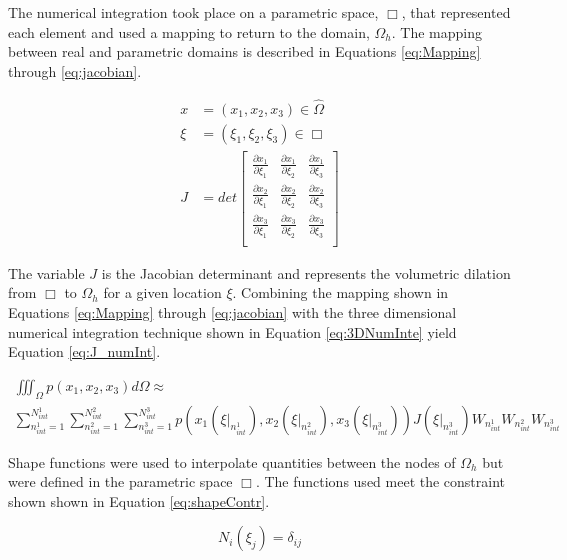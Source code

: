 \documentclass[a4paper, 12pt]{article}
\begin{document}
The numerical integration took place on a parametric space, $\Box$, that represented each
element and used a mapping to return to the domain, $\Omega_h$.
The mapping between real and parametric domains is described in
Equations \ref{eq:Mapping} through \ref{eq:jacobian}.

\begin{align}
x   &= (x_1, x_2, x_3) \in \hat{\Omega}
  \label{eq:Mapping} \\
\xi &= (\xi_1, \xi_2, \xi_3) \in \Box \\
J &= det
  \begin{bmatrix}
    \frac{\partial x_1}{\partial \xi_1} &
      \frac{\partial x_1}{\partial \xi_2} &
      \frac{\partial x_1}{\partial \xi_3} \\
    \frac{\partial x_2}{\partial \xi_1} &
      \frac{\partial x_2}{\partial \xi_2} &
      \frac{\partial x_2}{\partial \xi_3} \\
    \frac{\partial x_3}{\partial \xi_1} &
      \frac{\partial x_3}{\partial \xi_2} &
      \frac{\partial x_3}{\partial \xi_3} \\
  \end{bmatrix}
  \label{eq:jacobian}
\end{align}

\noindent
The variable $J$ is the Jacobian determinant and represents
the volumetric dilation from $\Box$ to $\Omega_h$ for a given location $\xi$.
Combining the mapping shown in Equations \ref{eq:Mapping} through
\ref{eq:jacobian} with the three dimensional numerical
integration technique shown in Equation \ref{eq:3DNumInte} yield
Equation \ref{eq:J_numInt}.

\begin{multline} \label{eq:J_numInt}
\iiint_{\Omega} p(x_1, x_2, x_3) d\Omega
  \approx \\
  \sum_{n^1_{int}=1}^{N^1_{int}}
  \sum_{n^2_{int}=1}^{N^2_{int}}
  \sum_{n^3_{int}=1}^{N^3_{int}}
  p(
  x_1(\xi\Big|_{n^1_{int}}),
  x_2(\xi\Big|_{n^2_{int}}),
  x_3(\xi\Big|_{n^3_{int}}))
  J( \xi\Big|_{n^3_{int}})
  W_{n^1_{int}}
  W_{n^2_{int}}
  W_{n^3_{int}}
\end{multline}

Shape functions were used to interpolate quantities between the
nodes of $\Omega_h$ but were defined in the parametric space $\Box$.
The functions used meet the constraint shown
shown in Equation \ref{eq:shapeContr}.

\begin{equation} \label{eq:shapeContr}
N_i(\xi_j) = \delta_{ij}
\end{equation}
\end{document}
